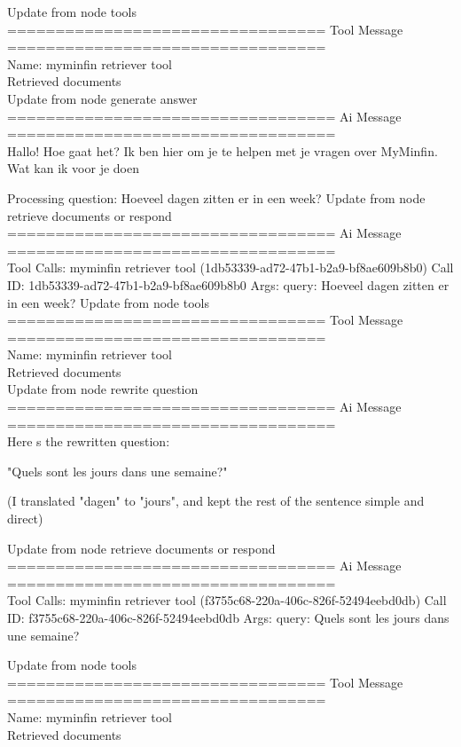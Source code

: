 Update from node tools
\\[1em]
================================= Tool Message =================================
\\[1em]
Name: myminfin retriever tool
\\[1em]
Retrieved documents
\\[1em]
Update from node generate answer
\\[1em]
================================== Ai Message ==================================
\\[1em]
Hallo! Hoe gaat het? Ik ben hier om je te helpen met je vragen over MyMinfin. Wat kan ik voor je doen

Processing question: Hoeveel dagen zitten er in een week?
Update from node retrieve documents or respond
\\[1em]
================================== Ai Message ==================================
\\[1em]
Tool Calls:
myminfin retriever tool (1db53339-ad72-47b1-b2a9-bf8ae609b8b0)
Call ID: 1db53339-ad72-47b1-b2a9-bf8ae609b8b0
Args:
query: Hoeveel dagen zitten er in een week?
Update from node tools
\\[1em]
================================= Tool Message =================================
\\[1em]
Name: myminfin retriever tool
\\[1em]
Retrieved documents
\\[1em]

Update from node rewrite question
\\[1em]
================================== Ai Message ==================================
\\[1em]
Here s the rewritten question:

"Quels sont les jours dans une semaine?" 

(I translated "dagen" to "jours", and kept the rest of the sentence simple and direct)

Update from node retrieve documents or respond
\\[1em]
================================== Ai Message ==================================
\\[1em]
Tool Calls:
myminfin retriever tool (f3755c68-220a-406c-826f-52494eebd0db)
Call ID: f3755c68-220a-406c-826f-52494eebd0db
Args:
query: Quels sont les jours dans une semaine?

Update from node tools
\\[1em]
================================= Tool Message =================================
\\[1em]
Name: myminfin retriever tool
\\[1em]
Retrieved documents
\\[1em]


